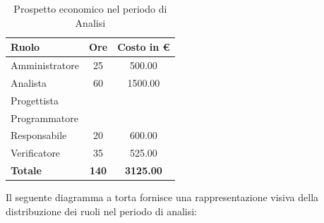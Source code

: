                 \begin{table}[htbp]
                    \centering
                    \begin{tabular}{| l c c |}
                        \hline
                        \textbf{Ruolo} & \textbf{Ore} & \textbf{Costo in €}\\
                        \hline
                        Amministratore & 25 & 500.00\\
                        Analista & 60 & 1500.00\\
                        Progettista & & \\
                        Programmatore & & \\
                        Responsabile & 20 & 600.00\\
                        Verificatore & 35 & 525.00\\
                        \hline
                        \textbf{Totale} & \textbf{140} & \textbf{3125.00}\\
                        \hline
                    \end{tabular}
                    \caption[Analisi - Prospetto economico]{Prospetto economico nel periodo di Analisi}
                \end{table}

\newpage

                Il seguente diagramma a torta fornisce una rappresentazione visiva della distribuzione dei ruoli nel periodo di analisi:

